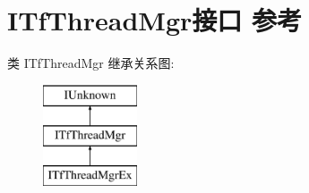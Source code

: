 \hypertarget{interface_i_tf_thread_mgr}{}\section{I\+Tf\+Thread\+Mgr接口 参考}
\label{interface_i_tf_thread_mgr}
类 I\+Tf\+Thread\+Mgr 继承关系图\+:\begin{figure}[H]
\begin{center}
\leavevmode
\includegraphics[height=3.000000cm]{interface_i_tf_thread_mgr}
\end{center}
\end{figure}

